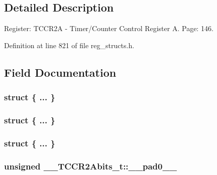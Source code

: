 \subsection{Detailed Description}
Register\+: T\+C\+C\+R2\+A -\/ Timer/\+Counter Control Register A. Page\+: 146. 

Definition at line 821 of file reg\+\_\+structs.\+h.



\subsection{Field Documentation}
\hypertarget{union_____t_c_c_r2_abits__t_aac7a3d8e1fd442078e5fd0c036351bfd}{\subsubsection[{"@201}]{\setlength{\rightskip}{0pt plus 5cm}struct \{ ... \} }}\label{union_____t_c_c_r2_abits__t_aac7a3d8e1fd442078e5fd0c036351bfd}
\hypertarget{union_____t_c_c_r2_abits__t_a5737ca11e9eca38e7c9b319cd5f9b866}{\subsubsection[{"@203}]{\setlength{\rightskip}{0pt plus 5cm}struct \{ ... \} }}\label{union_____t_c_c_r2_abits__t_a5737ca11e9eca38e7c9b319cd5f9b866}
\hypertarget{union_____t_c_c_r2_abits__t_a1798bfd9552d740ebacacae527405b32}{\subsubsection[{"@205}]{\setlength{\rightskip}{0pt plus 5cm}struct \{ ... \} }}\label{union_____t_c_c_r2_abits__t_a1798bfd9552d740ebacacae527405b32}
\hypertarget{union_____t_c_c_r2_abits__t_ad98298ba63b491ea882b3eca119453cb}{
\subsubsection[{\+\_\+\+\_\+pad0\+\_\+\+\_\+}]{\setlength{\rightskip}{0pt plus 5cm}unsigned \+\_\+\+\_\+\+T\+C\+C\+R2\+Abits\+\_\+t\+::\+\_\+\+\_\+pad0\+\_\+\+\_\+}}\label{union_____t_c_c_r2_abits__t_ad98298ba63b491ea882b3eca119453cb}


